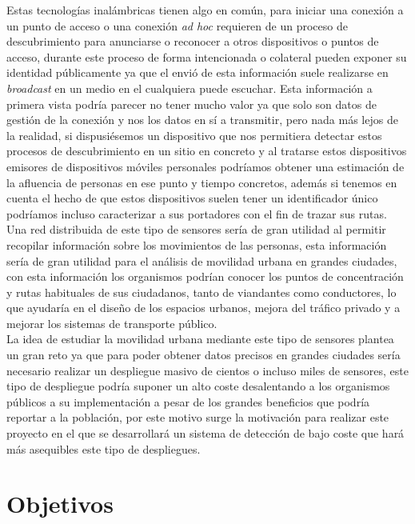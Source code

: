 \documentclass[../proyecto.tex]{subfiles}
\begin{document}
Estas tecnologías inalámbricas tienen algo en común, para iniciar una conexión a un punto de acceso o una conexión \textit{ad hoc} requieren de un proceso de descubrimiento para anunciarse o reconocer a otros dispositivos o puntos de acceso, durante este proceso de forma intencionada o colateral pueden exponer su identidad públicamente ya que el envió de esta información suele realizarse en \textit{broadcast} en un medio en el cualquiera puede escuchar. Esta información a primera vista podría parecer no tener mucho valor ya que solo son datos de gestión de la conexión y nos los datos en sí a transmitir, pero nada más lejos de la realidad, si dispusiésemos un dispositivo que nos permitiera detectar estos procesos de descubrimiento en un sitio en concreto y al tratarse estos dispositivos emisores de dispositivos móviles personales podríamos obtener una estimación de la afluencia de personas en ese punto y tiempo concretos, además si tenemos en cuenta el hecho de que estos dispositivos suelen tener un identificador único podríamos incluso caracterizar a sus portadores con el fin de trazar sus rutas.\\

Una red distribuida de este tipo de sensores sería de gran utilidad al permitir recopilar información sobre los movimientos de las personas, esta información sería de gran utilidad para el análisis de movilidad urbana en grandes ciudades, con esta información los organismos podrían conocer los puntos de concentración y rutas habituales de sus ciudadanos, tanto de viandantes como conductores, lo que ayudaría en el diseño de los espacios urbanos, mejora del tráfico privado y a mejorar los sistemas de transporte público.\\

La idea de estudiar la movilidad urbana mediante este tipo de sensores plantea un gran reto ya que para poder obtener datos precisos en grandes ciudades sería necesario realizar un despliegue masivo de cientos o incluso miles de sensores, este tipo de despliegue podría suponer un alto coste desalentando a los organismos públicos a su implementación a pesar de los grandes beneficios que podría reportar a la población, por este motivo surge la motivación para realizar este proyecto en el que se desarrollará un sistema de detección de bajo coste que hará más asequibles este tipo de despliegues.\\

\section{Objetivos}
\end{document}
